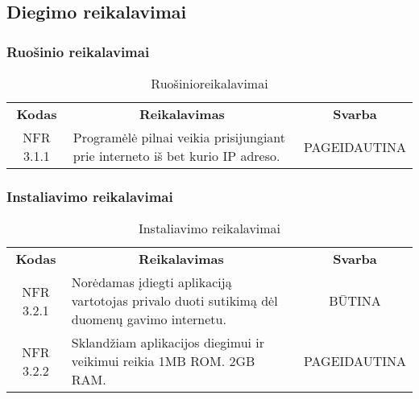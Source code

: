 \documentclass{VUMIFPSkursinis}
\begin{document}
\pagebreak

\subsection{Diegimo reikalavimai}

\subsubsection{Ruošinio reikalavimai}
\begin{center}
	\begin{table}[H]
	\begin{tabular}{|p{2cm}|p{}|p{}|}
	\hline
	    \rowcolor{lightgray}
		\multicolumn{3}{|c|}{Ruošinio reikalavimai}\\
		
	\hline
		\multicolumn{1}{|c|}{{\bfseries Kodas}}&
		\multicolumn{1}{|c|}{{\bfseries Reikalavimas}}&
		\multicolumn{1}{|c|}{{\bfseries Svarba}}\\
	\hline 	
		\multicolumn{1}{|c|}{NFR 3.1.1}&
		{Programėlė pilnai veikia prisijungiant prie interneto iš bet kurio IP adreso.}&
		\multicolumn{1}{|p{1.5cm}|}{PAGEIDAUTINA}\\	
	
	\hline
	
	
	\end{tabular}
	\caption{Ruošinioreikalavimai}
	\label{table:Ruošinioreikalavimai}
	\end{table}

\end{center}

\subsubsection{Instaliavimo reikalavimai }
\begin{center}
	\begin{table}[H]
	\begin{tabular}{|p{2cm}|p{}|p{}|}
	\hline
	    \rowcolor{lightgray}
		\multicolumn{3}{|c|}{Instaliavimo reikalavimai}\\
		
	\hline
		\multicolumn{1}{|c|}{{\bfseries Kodas}}&
		\multicolumn{1}{|c|}{{\bfseries Reikalavimas}}&
		\multicolumn{1}{|c|}{{\bfseries Svarba}}\\
	\hline 	
		\multicolumn{1}{|c|}{NFR 3.2.1}&
		{Norėdamas įdiegti aplikaciją vartotojas privalo duoti sutikimą dėl duomenų gavimo internetu.}&
		\multicolumn{1}{|c|}{BŪTINA}\\	
	
	\hline 	
		\multicolumn{1}{|c|}{NFR 3.2.2}&
		{Sklandžiam aplikacijos diegimui ir veikimui reikia 1MB ROM. 2GB RAM.}&
		\multicolumn{1}{|p{1.5cm}|}{PAGEIDAUTINA}\\	
	
	\hline
	
	
	\end{tabular}
	\caption{Instaliavimo reikalavimai}
	\label{table:Instaliavimoreikalavimai}
	\end{table}

\end{center}
\end{document}
